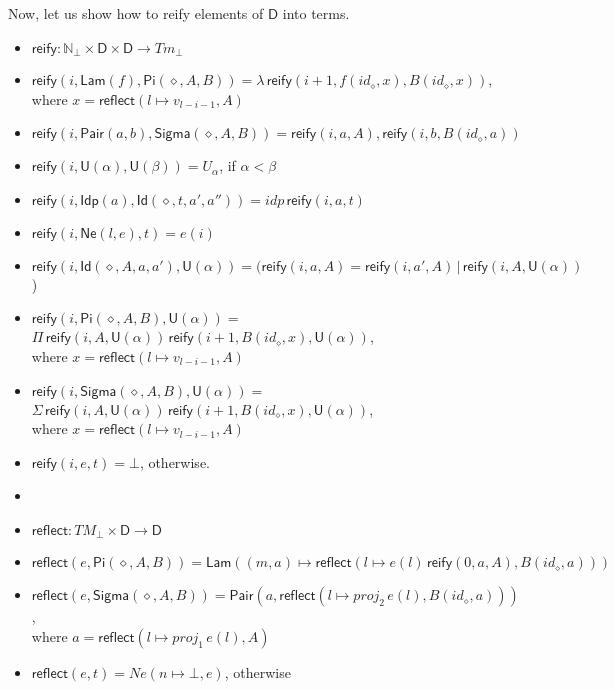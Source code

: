 \documentclass{amsart}
\theoremstyle{definition}
\theoremstyle{remark}
\newcommand{\D}{\mathsf{D}}
\newcommand{\nats}{\mathbb{N}}
\numberwithin{table}{section}
\begin{document}
Now, let us show how to reify elements of $\D$ into terms.
\begin{itemize}
\item[] $\mathsf{reify} : \nats_\bot \times \D \times \D \to Tm_\bot$
\item[] $\mathsf{reify}(i, \mathsf{Lam}(f), \mathsf{Pi}(\diamond, A, B)) = \lambda\,\mathsf{reify}(i + 1, f(id_\diamond, x), B(id_\diamond, x))$, \\
        \indent where $x = \mathsf{reflect}(l \mapsto v_{l - i - 1}, A)$
\item[] $\mathsf{reify}(i, \mathsf{Pair}(a, b), \mathsf{Sigma}(\diamond, A, B)) = \mathsf{reify}(i, a, A), \mathsf{reify}(i, b, B(id_\diamond, a))$
\item[] $\mathsf{reify}(i, \mathsf{U}(\alpha), \mathsf{U}(\beta)) = U_\alpha$, if $\alpha < \beta$
\item[] $\mathsf{reify}(i, \mathsf{Idp}(a), \mathsf{Id}(\diamond, t, a', a'')) = idp\,\mathsf{reify}(i, a, t)$
\item[] $\mathsf{reify}(i, \mathsf{Ne}(l, e), t) = e(i)$
\item[] $\mathsf{reify}(i, \mathsf{Id}(\diamond, A, a, a'), \mathsf{U}(\alpha)) = (\mathsf{reify}(i, a, A) = \mathsf{reify}(i, a', A)\,|\,\mathsf{reify}(i, A, \mathsf{U}(\alpha))$)
\item[] $\mathsf{reify}(i, \mathsf{Pi}(\diamond, A, B), \mathsf{U}(\alpha)) =$
        $\Pi\,\mathsf{reify}(i, A, \mathsf{U}(\alpha))\,\mathsf{reify}(i + 1, B(id_\diamond, x), \mathsf{U}(\alpha))$, \\
        \indent where $x = \mathsf{reflect}(l \mapsto v_{l - i - 1}, A)$
\item[] $\mathsf{reify}(i, \mathsf{Sigma}(\diamond, A, B), \mathsf{U}(\alpha)) = $
        $\Sigma\,\mathsf{reify}(i, A, \mathsf{U}(\alpha))\,\mathsf{reify}(i + 1, B(id_\diamond, x), \mathsf{U}(\alpha))$, \\
        \indent where $x = \mathsf{reflect}(l \mapsto v_{l - i - 1}, A)$
\item[] $\mathsf{reify}(i, e, t) = \bot$, otherwise.
\item[]
\item[] $\mathsf{reflect} : TM_\bot \times \D \to \D$
\item[] $\mathsf{reflect}(e,\mathsf{Pi}(\diamond, A, B)) = \mathsf{Lam}((m, a) \mapsto \mathsf{reflect}(l \mapsto e(l)\,\mathsf{reify}(0, a, A), B(id_\diamond, a)))$
\item[] $\mathsf{reflect}(e,\mathsf{Sigma}(\diamond, A, B)) = \mathsf{Pair}(a, \mathsf{reflect}(l \mapsto proj_2\,e(l), B(id_\diamond, a)))$, \\
        \indent where $a = \mathsf{reflect}(l \mapsto proj_1\,e(l), A)$
\item[] $\mathsf{reflect}(e,t) = Ne(n \mapsto \bot, e)$, otherwise
\end{itemize}



\end{document}
